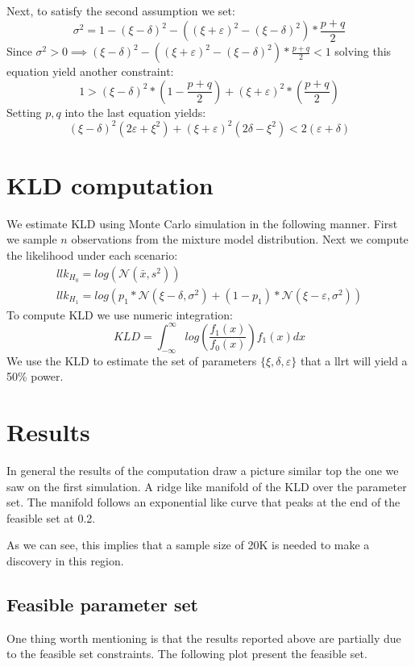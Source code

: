 \documentclass[12pt]{article}
\begin{document}
Next, to satisfy the second assumption we set:
\begin{equation}
  \sigma^2 = 1 - (\xi - \delta)^2 - ((\xi + \varepsilon)^2 - (\xi - \delta)^2) * \frac{p + q}{2}
  \end{equation}  
Since $\sigma^2 > 0 \implies (\xi - \delta)^2 - ((\xi + \varepsilon)^2 - (\xi - \delta)^2) * \frac{p + q}{2} < 1$  
solving this equation yield another constraint:
\begin{equation}
1 > (\xi - \delta)^2 * (1 - \frac{p+q}{2}) + (\xi + \varepsilon)^2 * (\frac{p+q}{2})
\end{equation}
Setting $p,q$ into the last equation yields:
\begin{equation}
(\xi - \delta)^2(2\varepsilon + \xi ^2) + (\xi + \varepsilon)^2(2\delta - \xi ^2) < 2(\varepsilon + \delta)
\end{equation}
\section{KLD computation}
We estimate KLD using Monte Carlo simulation in the following manner. First we sample $n$ observations from the mixture model distribution. Next we compute the likelihood under each scenario:
\begin{gather}
llk_{H_0} = log(\mathcal{N}(\bar{x}, s^2)) \\
llk_{H_1} = log(p_1 * \mathcal{N}(\xi - \delta, \sigma^2) + (1- p_1)* \mathcal{N}(\xi - \varepsilon, \sigma^2))
\end{gather}  	 
To compute KLD we use numeric integration:
\begin{equation}
KLD = \int_{-\infty}^{\infty}log(\frac{f_1(x)}{f_0(x)})f_1(x)dx
\end{equation}
We use the KLD to estimate the set of parameters $\{\xi,\delta,\varepsilon\}$ that a llrt will yield a 50\% power.
\section{Results}
In general the results of the computation draw a picture similar top the one we saw on the first simulation. A ridge like manifold of the KLD over the parameter set. The manifold follows an exponential like curve that peaks at the end of the feasible set at 0.2. 

As we can see, this implies that a sample size of 20K is needed to make a discovery in this region.
\subsection{Feasible parameter set}
One thing worth mentioning is that the results reported above are partially due to the feasible set constraints. The following plot present the feasible set. 
\end{document}
